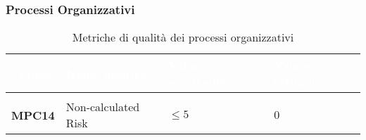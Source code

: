 \subsubsection{Processi Organizzativi}

{
\renewcommand{\arraystretch}{1.5}
\centering
\begin{longtable}{C{2.5cm} | C{5.5cm} | C{3.5cm} | C{3.5cm}}
\textcolor{white}{\textbf{Codice}}&
\textcolor{white}{\textbf{Nome metrica}}&
\textcolor{white}{\textbf{Valore accettabile}}&
\textcolor{white}{\textbf{Valore ottimale}}\\	

\endhead
\endfoot
{}\caption{Metriche di qualità dei processi organizzativi}
\endlastfoot

 \\

\textbf{MPC14} & Non-calculated Risk & $ \leq 5 $ & $ 0 $ \\
\end{longtable}
}